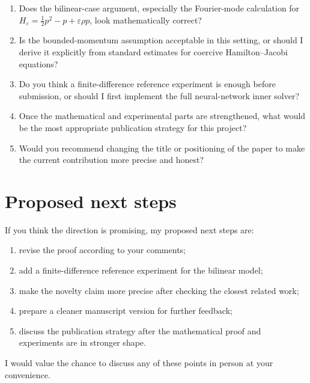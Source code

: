 \documentclass[11pt]{article}
\newcommand{\eps}{\varepsilon}
\begin{document}
\begin{enumerate}[leftmargin=*]
  \item Does the bilinear-case argument, especially the Fourier-mode calculation for
  $H_\eps=\frac12p^2-p+\eps\rho p$, look mathematically correct?

  \item Is the bounded-momentum assumption acceptable in this setting, or should I derive it explicitly from standard estimates for coercive Hamilton--Jacobi equations?

  \item Do you think a finite-difference reference experiment is enough before submission, or should I first implement the full neural-network inner solver?

  \item Once the mathematical and experimental parts are strengthened, what would be the most appropriate publication strategy for this project?

  \item Would you recommend changing the title or positioning of the paper to make the current contribution more precise and honest?
\end{enumerate}

\section{Proposed next steps}

If you think the direction is promising, my proposed next steps are:

\begin{enumerate}[leftmargin=*]
  \item revise the proof according to your comments;
  \item add a finite-difference reference experiment for the bilinear model;
  \item make the novelty claim more precise after checking the closest related work;
  \item prepare a cleaner manuscript version for further feedback;
  \item discuss the publication strategy after the mathematical proof and experiments are in stronger shape.
\end{enumerate}

I would value the chance to discuss any of these points in person at your convenience.
\end{document}

